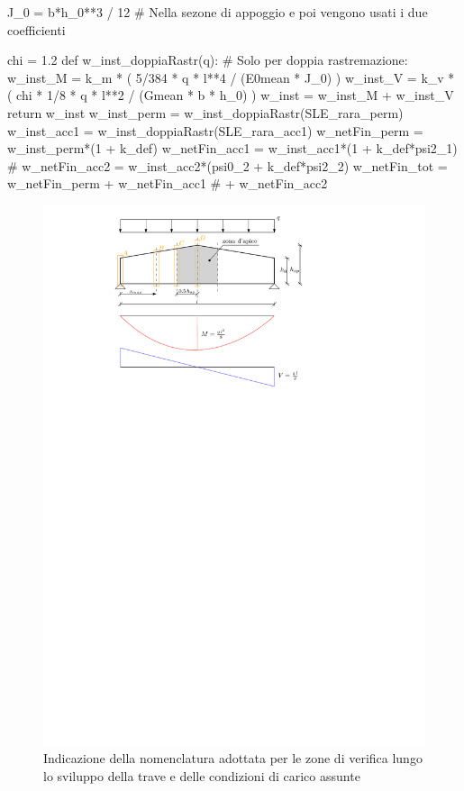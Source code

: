 \begin{pycode}[TraveDoppiaRastremazione]
J_0 = b*h_0**3 / 12 # Nella sezone di appoggio e poi vengono usati i due coefficienti

chi = 1.2
def w_inst_doppiaRastr(q): # Solo per doppia rastremazione:
    w_inst_M = k_m * ( 5/384 * q * l**4 / (E0mean * J_0) )
    w_inst_V = k_v * ( chi * 1/8 * q * l**2 / (Gmean * b * h_0) )
    w_inst = w_inst_M + w_inst_V
    return w_inst
w_inst_perm = w_inst_doppiaRastr(SLE_rara_perm)
w_inst_acc1 = w_inst_doppiaRastr(SLE_rara_acc1)
w_netFin_perm = w_inst_perm*(1 + k_def)
w_netFin_acc1 = w_inst_acc1*(1 + k_def*psi2_1)
# w_netFin_acc2 = w_inst_acc2*(psi0_2 + k_def*psi2_2)
w_netFin_tot = w_netFin_perm + w_netFin_acc1 # + w_netFin_acc2

\end{pycode}

\begin{pysub}[TraveDoppiaRastremazione]
\begin{figure}[H]
    \centering
    \includegraphics[]{IMG/TraveDoppiaRastremazione.pdf}
    \caption{Indicazione della nomenclatura adottata per le zone di verifica lungo lo sviluppo della trave e delle condizioni di carico assunte}
    \label{fig:TraveDoppiaRastremazione}
\end{figure}


\end{pysub}
